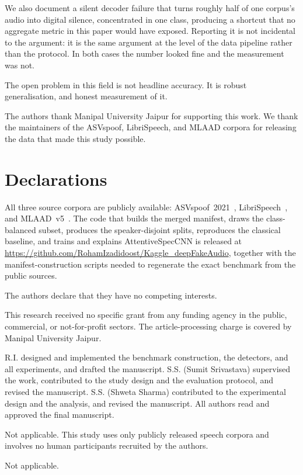 \documentclass[sn-mathphys-num,pdflatex]{sn-jnl}
\begin{document}
We also document a silent decoder failure that turns roughly half of one
corpus's audio into digital silence, concentrated in one class, producing a
shortcut that no aggregate metric in this paper would have exposed. Reporting it
is not incidental to the argument: it is the same argument at the level of the
data pipeline rather than the protocol. In both cases the number looked fine and
the measurement was not.

The open problem in this field is not headline accuracy. It is robust
generalisation, and honest measurement of it.

\backmatter

The authors thank Manipal University Jaipur for supporting this work. We thank
the maintainers of the ASVspoof, LibriSpeech, and MLAAD corpora for releasing
the data that made this study possible.

\section*{Declarations}

All three source corpora are publicly available: ASVspoof~2021~\cite{asvspoof21},
LibriSpeech~\cite{librispeech}, and MLAAD~v5~\cite{mlaad}. The code that builds
the merged manifest, draws the class-balanced subset, produces the
speaker-disjoint splits, reproduces the classical baseline, and trains and
explains AttentiveSpecCNN is released at
\url{https://github.com/RohamIzadidoost/Kaggle_deepFakeAudio},
together with the manifest-construction scripts needed to regenerate the exact
benchmark from the public sources.

The authors declare that they have no competing interests.

This research received no specific grant from any funding agency in the public,
commercial, or not-for-profit sectors. The article-processing charge is covered
by Manipal University Jaipur.

R.I. designed and implemented the benchmark construction, the detectors, and all
experiments, and drafted the manuscript. S.S. (Sumit Srivastava) supervised the
work, contributed to the study design and the evaluation protocol, and revised
the manuscript. S.S. (Shweta Sharma) contributed to the experimental design and
the analysis, and revised the manuscript. All authors read and approved the
final manuscript.

Not applicable. This study uses only publicly released speech corpora and
involves no human participants recruited by the authors.

Not applicable.


\end{document}

